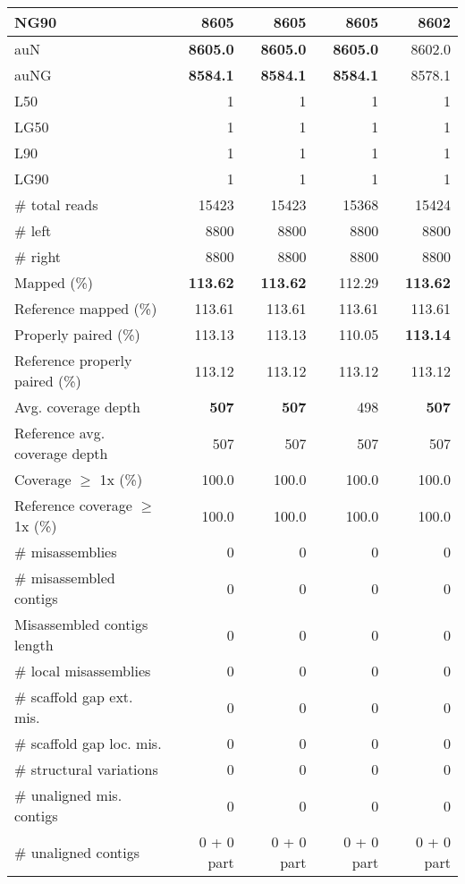 \documentclass[12pt,a4paper]{article}
\begin{document}
\begin{table}[ht]
\begin{center}
\begin{tabular}{|l*{4}{|r}|}
NG90 & {\bf 8605} & {\bf 8605} & {\bf 8605} & 8602 \\ \hline
auN & {\bf 8605.0} & {\bf 8605.0} & {\bf 8605.0} & 8602.0 \\ \hline
auNG & {\bf 8584.1} & {\bf 8584.1} & {\bf 8584.1} & 8578.1 \\ \hline
L50 & 1 & 1 & 1 & 1 \\ \hline
LG50 & 1 & 1 & 1 & 1 \\ \hline
L90 & 1 & 1 & 1 & 1 \\ \hline
LG90 & 1 & 1 & 1 & 1 \\ \hline
\# total reads & 15423 & 15423 & 15368 & 15424 \\ \hline
\# left & 8800 & 8800 & 8800 & 8800 \\ \hline
\# right & 8800 & 8800 & 8800 & 8800 \\ \hline
Mapped (\%) & {\bf 113.62} & {\bf 113.62} & 112.29 & {\bf 113.62} \\ \hline
Reference mapped (\%) & 113.61 & 113.61 & 113.61 & 113.61 \\ \hline
Properly paired (\%) & 113.13 & 113.13 & 110.05 & {\bf 113.14} \\ \hline
Reference properly paired (\%) & 113.12 & 113.12 & 113.12 & 113.12 \\ \hline
Avg. coverage depth & {\bf 507} & {\bf 507} & 498 & {\bf 507} \\ \hline
Reference avg. coverage depth & 507 & 507 & 507 & 507 \\ \hline
Coverage $\geq$ 1x (\%) & 100.0 & 100.0 & 100.0 & 100.0 \\ \hline
Reference coverage $\geq$ 1x (\%) & 100.0 & 100.0 & 100.0 & 100.0 \\ \hline
\# misassemblies & 0 & 0 & 0 & 0 \\ \hline
\# misassembled contigs & 0 & 0 & 0 & 0 \\ \hline
Misassembled contigs length & 0 & 0 & 0 & 0 \\ \hline
\# local misassemblies & 0 & 0 & 0 & 0 \\ \hline
\# scaffold gap ext. mis. & 0 & 0 & 0 & 0 \\ \hline
\# scaffold gap loc. mis. & 0 & 0 & 0 & 0 \\ \hline
\# structural variations & 0 & 0 & 0 & 0 \\ \hline
\# unaligned mis. contigs & 0 & 0 & 0 & 0 \\ \hline
\# unaligned contigs & 0 + 0 part & 0 + 0 part & 0 + 0 part & 0 + 0 part \\ \hline

\end{tabular}
\end{center}
\end{table}
\end{document}
